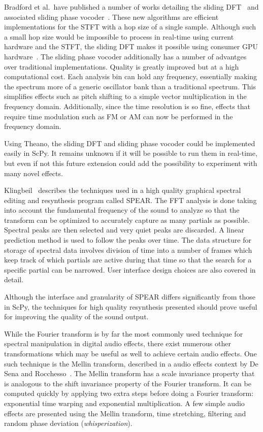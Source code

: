 \documentclass{article}
\begin{document}
Bradford et al.\ have published a number of works detailing the sliding
DFT~\cite{bradford2005sliding} and associated sliding phase vocoder~\cite{bradford2007sliding}.
These new algorithms are efficient implementations for the STFT with a hop size of a single sample.
Although such a small hop size would be impossible to process in real-time using current hardware
and the STFT, the sliding DFT makes it possible using consumer GPU
hardware~\cite{bradford2011real}. The sliding phase vocoder additionally has a number of advantges
over traditional implementations. Quality is greatly improved but at a high computational cost. Each
analysis bin can hold any frequency, essentially making the spectrum more of a generic oscillator
bank than a traditional spectrum. This simplifies effects such as pitch shifting to a simple vector
multiplication in the frequency domain. Additionally, since the time resolution is so fine, effects
that require time modulation such as FM or AM can now be performed in the frequency domain.

Using Theano, the sliding DFT and sliding phase vocoder could be implemented easily in ScPy. It
remains unknown if it will be possible to run them in real-time, but even if not this future
extension could add the possibility to experiment with many novel effects.

Klingbeil~\cite{klingbeil2005software} describes the techniques used in a high quality graphical
spectral editing and resynthesis program called SPEAR\@. The FFT analysis is done taking into
account the fundamental frequency of the sound to analyze so that the transform can be optimized
to accurately capture as many partials as possible. Spectral peaks are then selected and very quiet
peaks are discarded. A linear prediction method is used to follow the peaks over time. The data
structure for storage of spectral data involves division of time into a number of frames which keep
track of which partials are active during that time so that the search for a specific partial can
be narrowed. User interface design choices are also covered in detail.

Although the interface and granularity of SPEAR differs significantly from those in ScPy, the
techniques for high quality resynthesis presented should prove useful for improving the quality of
the sound output.

While the Fourier transform is by far the most commonly used technique for spectral manipulation in
digital audio effects, there exist numerous other transformations which may be useful as well to
achieve certain audio effects. One such technique is the Mellin transform, described in a audio
effects context by De Sena and Rocchesso~\cite{de2004fast}. The Mellin transform has a scale
invariance property that is analogous to the shift invariance property of the Fourier transform. It
can be computed quickly by applying two extra steps before doing a Fourier transform: exponential
time warping and exponential multiplication. A few simple audio effects are presented using the
Mellin transform, time stretching, filtering and random phase deviation (\textit{whisperization}).
\end{document}
